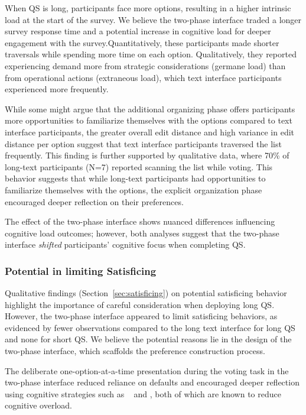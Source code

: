 When QS is long, participants face more options, resulting in a higher intrinsic load at the start of the survey. We believe the two-phase interface traded a longer survey response time and a potential increase in cognitive load for deeper engagement with the survey.Quantitatively, these participants made shorter traversals while spending more time on each option. Qualitatively, they reported experiencing demand more from strategic considerations (germane load) than from operational actions (extraneous load), which text interface participants experienced more frequently.

While some might argue that the additional organizing phase offers participants more opportunities to familiarize themselves with the options compared to text interface participants, the greater overall edit distance and high variance in edit distance per option suggest that text interface participants traversed the list frequently. This finding is further supported by qualitative data, where 70\% of long-text participants (N=7) reported scanning the list while voting. This behavior suggests that while long-text participants had opportunities to familiarize themselves with the options, the explicit organization phase encouraged deeper reflection on their preferences.

The effect of the two-phase interface shows nuanced differences influencing cognitive load outcomes; however, both analyses suggest that the two-phase interface \textit{shifted} participants' cognitive focus when completing QS.

\subsubsection{Potential in limiting Satisficing}
Qualitative findings (Section~\ref{sec:satisficing}) on potential satisficing behavior highlight the importance of careful consideration when deploying long QS. However, the two-phase interface appeared to limit satisficing behaviors, as evidenced by fewer observations compared to the long text interface for long QS and none for short QS. We believe the potential reasons lie in the design of the two-phase interface, which scaffolds the preference construction process.

The deliberate one-option-at-a-time presentation during the voting task in the two-phase interface reduced reliance on defaults and encouraged deeper reflection using cognitive strategies such as \textit{}~\cite{simonSciencesArtificial1996} and \textit{}, both of which are known to reduce cognitive overload.

